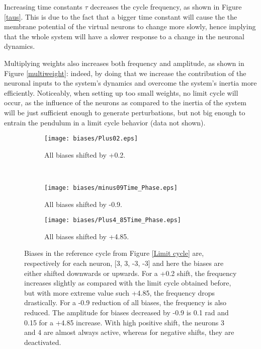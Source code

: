 \documentclass{cmc}
\begin{document}
Increasing time constants $\tau$ decreases the cycle frequency, as shown in Figure \ref{taus}. This is due to the fact that a bigger time constant will cause the the membrane potential of the virtual neurons to change more slowly, hence implying that the whole system will have a slower response to a change in the neuronal dynamics. 

Multiplying weights also increases both frequency and amplitude, as shown in Figure \ref{multiweight}: indeed, by doing that we increase the contribution of the neuronal inputs to the system's dynamics and overcome the system's inertia more efficiently. Noticeably, when setting up too small weights, no limit cycle will occur, as the influence of the neurons as compared to the inertia of the system will be just sufficient enough to generate perturbations, but not big enough to entrain the pendulum in a limit cycle behavior (data not shown).
\begin{figure}[H]
\centering
 \begin{subfigure}[t]{0.5\textwidth}
  \centering
  \texttt{[image: biases/Plus02.eps]}
  \caption{All biases shifted by +0.2.}
 \end{subfigure}
 ~
 \begin{subfigure}[t]{0.4\textwidth}
 	\centering
 	\texttt{[image: biases/minus09Time\_Phase.eps]}
 	\caption{All biases shifted by -0.9.}
 \end{subfigure}
 
 \begin{subfigure}[t]{0.5\textwidth}
 	\centering
    \texttt{[image: biases/Plus4\_85Time\_Phase.eps]}
    \caption{All biases shifted by +4.85.}
  \end{subfigure}
  \caption{Biases in the reference cycle from Figure \ref{Limit cycle} are, respectively for each neuron, [3, 3, -3, -3] and here the biases are either shifted downwards or upwards. For a +0.2 shift, the frequency increases slightly as compared with the limit cycle obtained before, but with more extreme value such +4.85, the frequency drops drastically. For a -0.9 reduction of all biases, the frequency is also reduced. The amplitude for biases decreased by -0.9 is 0.1 rad and 0.15 for a +4.85 increase. With high positive shift, the neurons 3 and 4 are almost always active, whereas for negative shifts, they are deactivated.}
  \label{Biases}
\end{figure}
\end{document}

